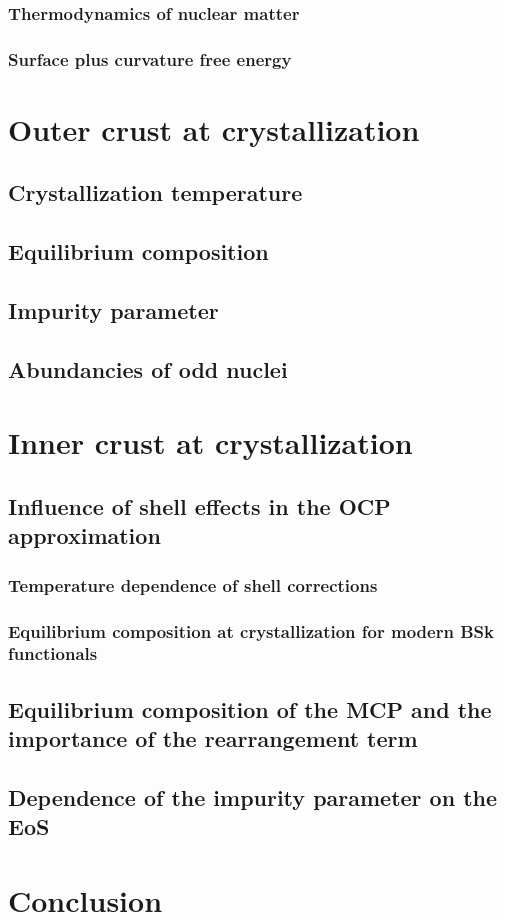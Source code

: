 \subsubsection{Thermodynamics of nuclear matter}

\subsubsection{Surface plus curvature free energy}

\section{Outer crust at crystallization}

\subsection{Crystallization temperature}

\subsection{Equilibrium composition}


\subsection{Impurity parameter}

\subsection{Abundancies of odd nuclei}

\section{Inner crust at crystallization}

\subsection{Influence of shell effects in the OCP approximation}

\subsubsection{Temperature dependence of shell corrections}

\subsubsection{Equilibrium composition at crystallization for modern BSk 
functionals}

\subsection{Equilibrium composition of the MCP and the importance of the
rearrangement term}

\subsection{Dependence of the impurity parameter on the EoS}

\section{Conclusion}
